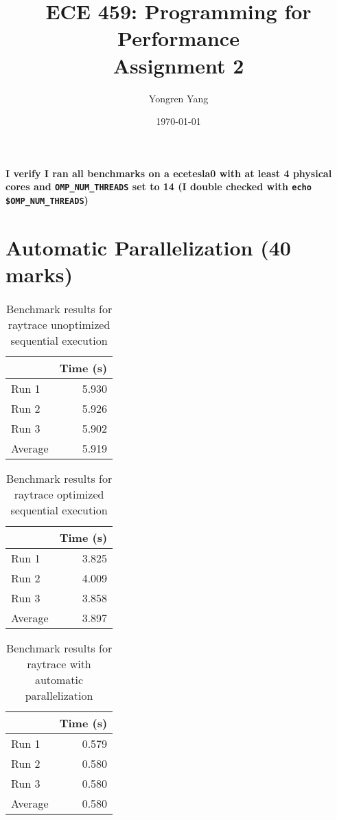 \documentclass[12pt]{article}
\title{ECE 459: Programming for Performance\\Assignment 2}
\author{Yongren Yang}
\date{\today}
\begin{document}
\maketitle

{\bf I verify I ran all benchmarks on a ecetesla0 with at least 4 physical cores and
{\tt OMP\_NUM\_THREADS} set to 14 (I double checked with
{\tt echo \$OMP\_NUM\_THREADS})}

\section*{Automatic Parallelization (40 marks)}

\begin{table}[H]
  \centering
  \begin{tabular}{lr}
    & {\bf Time (s)} \\
    \hline
    Run 1 & 5.930 \\
    Run 2 & 5.926 \\
    Run 3 & 5.902 \\
    \hline
    Average & 5.919 \\
  \end{tabular}
  \caption{Benchmark results for raytrace unoptimized sequential execution}
  \label{tbl-raytrace-unopt-sequential}
\end{table}

\begin{table}[H]
  \centering
  \begin{tabular}{lr}
    & {\bf Time (s)} \\
    \hline
    Run 1 & 3.825 \\
    Run 2 & 4.009 \\
    Run 3 & 3.858 \\
    \hline
    Average & 3.897 \\
  \end{tabular}
  \caption{Benchmark results for raytrace optimized sequential execution}
  \label{tbl-raytrace-opt-sequential}
\end{table}

\begin{table}[H]
  \centering
  \begin{tabular}{lr}
    & {\bf Time (s)} \\
    \hline
    Run 1 & 0.579 \\
    Run 2 & 0.580 \\
    Run 3 & 0.580 \\
    \hline
    Average & 0.580 \\
  \end{tabular}
  \caption{Benchmark results for raytrace with automatic parallelization}
  \label{tbl-raytrace-automatic}
\end{table}
\end{document}
